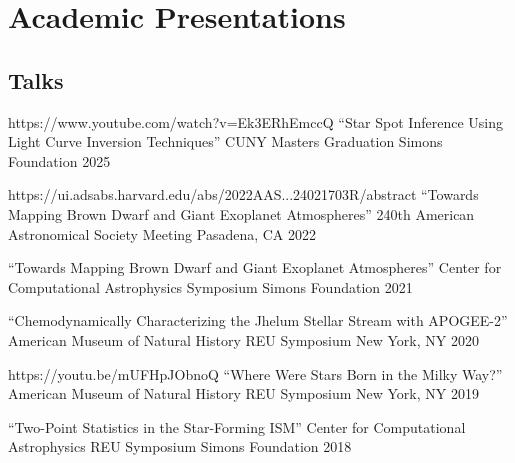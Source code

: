 \section{Academic Presentations}


\subsection*{Talks}

\begin{presentation}
{\cvlink
  {https://www.youtube.com/watch?v=Ek3ERhEmccQ}
  {``Star Spot Inference Using Light Curve Inversion Techniques''}}
{CUNY Masters Graduation}
{Simons Foundation}
{2025}
\end{presentation}

\begin{presentation}
{\cvlink
  {https://ui.adsabs.harvard.edu/abs/2022AAS...24021703R/abstract}
  {``Towards Mapping Brown Dwarf and Giant Exoplanet Atmospheres''}}
{240th American Astronomical Society Meeting}
{Pasadena, CA}
{2022}
\end{presentation}

\begin{presentation}
{``Towards Mapping Brown Dwarf and Giant Exoplanet Atmospheres''}
{Center for Computational Astrophysics Symposium}
{Simons Foundation}
{2021}
\end{presentation}

\begin{presentation}
{``Chemodynamically Characterizing the Jhelum Stellar Stream with APOGEE-2''}
{American Museum of Natural History REU Symposium}
{New York, NY}
{2020}
\end{presentation}

\begin{presentation}
{\cvlink
  {https://youtu.be/mUFHpJObnoQ}
  {``Where Were Stars Born in the Milky Way?''}}
{American Museum of Natural History REU Symposium}
{New York, NY}
{2019}
\end{presentation}

\begin{presentation}
{``Two-Point Statistics in the Star-Forming ISM''}
{Center for Computational Astrophysics REU Symposium}
{Simons Foundation}
{2018}
\end{presentation}

